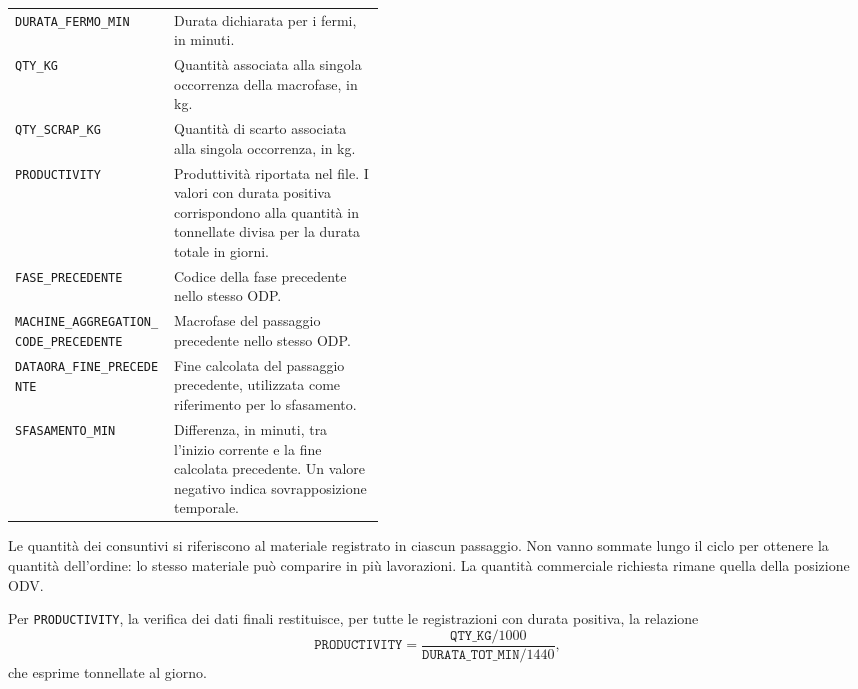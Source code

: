 \begin{longtable}{@{}p{0.43\linewidth}p{}@{}}
\texttt{DURATA\_FERMO\_MIN} & Durata dichiarata per i fermi, in minuti. \\
\texttt{QTY\_KG} & Quantità associata alla singola occorrenza della macrofase, in kg. \\
\texttt{QTY\_SCRAP\_KG} & Quantità di scarto associata alla singola occorrenza, in kg. \\
\texttt{PRODUCTIVITY} & Produttività riportata nel file. I valori con durata positiva corrispondono alla quantità in tonnellate divisa per la durata totale in giorni. \\
\texttt{FASE\_PRECEDENTE} & Codice della fase precedente nello stesso ODP. \\
\texttt{MACHINE\_AGGREGATION\_CODE\_PRECEDENTE} & Macrofase del passaggio precedente nello stesso ODP. \\
\texttt{DATAORA\_FINE\_PRECEDENTE} & Fine calcolata del passaggio precedente, utilizzata come riferimento per lo sfasamento. \\
\texttt{SFASAMENTO\_MIN} & Differenza, in minuti, tra l'inizio corrente e la fine calcolata precedente. Un valore negativo indica sovrapposizione temporale. \\
\end{longtable}
\endgroup

Le quantità dei consuntivi si riferiscono al materiale registrato in ciascun passaggio. Non vanno sommate lungo il ciclo per ottenere la quantità dell'ordine: lo stesso materiale può comparire in più lavorazioni. La quantità commerciale richiesta rimane quella della posizione ODV.

Per \texttt{PRODUCTIVITY}, la verifica dei dati finali restituisce, per tutte le registrazioni con durata positiva, la relazione
\[
\texttt{PRODUCTIVITY}
=\frac{\texttt{QTY\_KG}/1000}{\texttt{DURATA\_TOT\_MIN}/1440},
\]
che esprime tonnellate al giorno.


